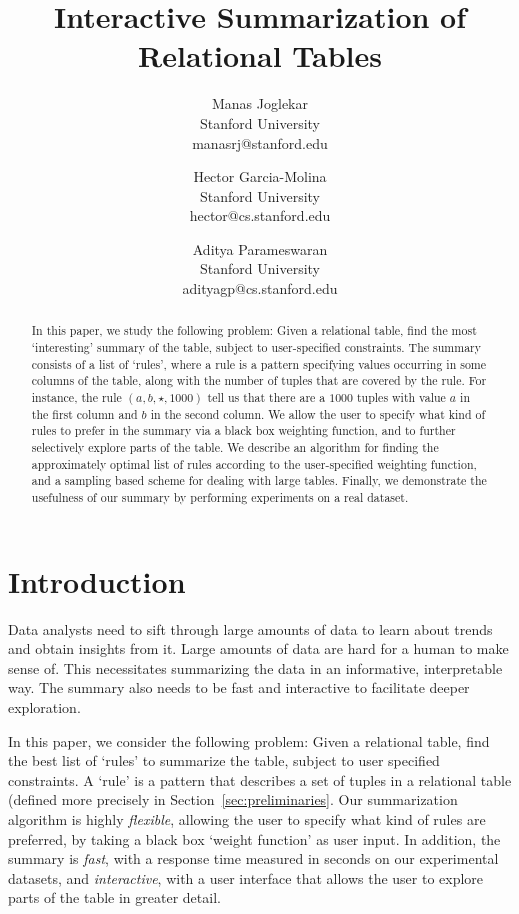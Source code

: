 \documentclass{sig-alternate}
\title{Interactive Summarization of Relational Tables}
\author{
Manas Joglekar\\Stanford University\\manasrj@stanford.edu
\and
Hector Garcia-Molina\\Stanford University\\hector@cs.stanford.edu
\and
Aditya Parameswaran\\Stanford University\\adityagp@cs.stanford.edu
}
\newcounter{prob}
\begin{document}
\maketitle

\begin{abstract}
In this paper, we study the following problem: Given a relational table, find the most `interesting' summary of the table, subject to user-specified constraints. The summary consists of a list of `rules', where a rule is a pattern specifying values occurring in some columns of the table, along with the number of tuples that are covered by the rule. For instance, the rule $(a, b, \star, 1000)$ tell us that there are a $1000$ tuples with value $a$ in the first column and $b$ in the second column. We allow the user to specify what kind of rules to prefer in the summary via a black box weighting function, and to further selectively explore parts of the table. We describe an algorithm for finding the approximately optimal list of rules according to the user-specified weighting function, and a sampling based scheme for dealing with large tables. Finally, we demonstrate the usefulness of our summary by performing experiments on a real dataset.
\end{abstract}

\section{Introduction}

Data analysts need to sift through large amounts of data to learn about trends and obtain insights from it. Large amounts of data are hard for a human to make sense of. This necessitates summarizing the data in an informative, interpretable way. The summary also needs to be fast and interactive to facilitate deeper exploration.

In this paper, we consider the following problem: Given a relational table, find the best list of `rules' to summarize the table, subject to user specified constraints. A `rule' is a pattern that describes a set of tuples in a relational table (defined more precisely in Section~\ref{sec:preliminaries}. Our summarization algorithm is highly {\em flexible}, allowing the user to specify what kind of rules are preferred, by taking a black box `weight function' as user input. In addition, the summary is {\em fast}, with a response time measured in seconds on our experimental datasets, and {\em interactive}, with a user interface that allows the user to explore parts of the table in greater detail. 
\end{document}
